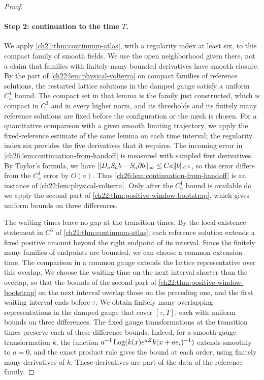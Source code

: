 \begin{proof}
\paragraph{Step 2: continuation to the time $T$.}
We apply \cref{ch21:thm:continuum-atlas}, with a regularity index at least six, to this compact family of smooth fields. We use the open neighborhood given there, not a claim that families with finitely many bounded derivatives have smooth closure. By the part of \cref{ch22:lem:physical-volterra} on compact families of reference solutions, the restarted lattice solutions in the damped gauge satisfy a uniform $C_a^1$ bound. The compact set in that lemma is the family just constructed, which is compact in $C^3$ and in every higher norm, and its thresholds and its finitely many reference solutions are fixed before the configuration or the mesh is chosen. For a quantitative comparison with a given smooth limiting trajectory, we apply the fixed-reference estimate of the same lemma on each time interval; the regularity index six provides the five derivatives that it requires. The incoming error in \cref{ch26:lem:continuation-from-handoff} is measured with sampled first derivatives. By Taylor's formula, we have $\lVert D_aS_ab-S_a\partial b\rVert_\infty\le Ca\lVert b\rVert_{C^2}$, so this error differs from the $C_a^1$ error by $O(a)$. Thus \cref{ch26:lem:continuation-from-handoff} is an instance of \cref{ch22:lem:physical-volterra}. Only after the $C_a^1$ bound is available do we apply the second part of \cref{ch22:thm:positive-window-bootstrap}, which gives uniform bounds on three differences.

The waiting times leave no gap at the transition times. By the local existence statement in $C^6$ of \cref{ch21:thm:continuum-atlas}, each reference solution extends a fixed positive amount beyond the right endpoint of its interval. Since the finitely many families of endpoints are bounded, we can choose a common extension time. The comparison in a common gauge extends the lattice representative over this overlap. We choose the waiting time on the next interval shorter than the overlap, so that the bounds of the second part of \cref{ch22:thm:positive-window-bootstrap} on the next interval overlap those on the preceding one, and the first waiting interval ends before $\tau$. We obtain finitely many overlapping representations in the damped gauge that cover $[\tau,T]$, each with uniform bounds on three differences. The fixed gauge transformations at the transition times preserve each of these difference bounds. Indeed, for a smooth gauge transformation $k$, the function $a^{-1}\operatorname{Log}(k(x)e^{aZ}k(x+ae_i)^{-1})$ extends smoothly to $a=0$, and the exact product rule gives the bound at each order, using finitely many derivatives of $k$. These derivatives are part of the data of the reference family.


\end{proof}
